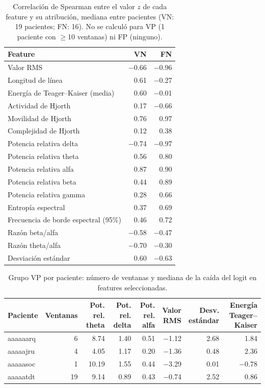 \begin{table}[htbp]
\centering
\small
\caption{Correlación de Spearman entre el valor $z$ de cada feature y su atribución, mediana entre pacientes (VN: 19 pacientes; FN: 16). No se calculó para VP (1 paciente con $\geq$10 ventanas) ni FP (ninguno).}
\label{tab:direccion}
\begin{tabular}{lrr}
\toprule
Feature & VN & FN \\
\midrule
Valor RMS & $-$0.66 & $-$0.96 \\
Longitud de línea & 0.61 & $-$0.27 \\
Energía de Teager--Kaiser (media) & 0.60 & $-$0.01 \\
Actividad de Hjorth & 0.17 & $-$0.66 \\
Movilidad de Hjorth & 0.76 & 0.97 \\
Complejidad de Hjorth & 0.12 & 0.38 \\
Potencia relativa delta & $-$0.74 & $-$0.97 \\
Potencia relativa theta & 0.56 & 0.80 \\
Potencia relativa alfa & 0.87 & 0.90 \\
Potencia relativa beta & 0.44 & 0.89 \\
Potencia relativa gamma & 0.28 & 0.66 \\
Entropía espectral & 0.37 & 0.69 \\
Frecuencia de borde espectral (95\%) & 0.46 & 0.72 \\
Razón beta/alfa & $-$0.58 & $-$0.47 \\
Razón theta/alfa & $-$0.70 & $-$0.30 \\
Desviación estándar & 0.60 & $-$0.63 \\
\bottomrule
\end{tabular}
\end{table}

\begin{table}[htbp]
\centering
\small
\caption{Grupo VP por paciente: número de ventanas y mediana de la caída del logit en features seleccionadas.}
\label{tab:vp_pac}
\begin{tabular}{lrrrrrrr}
\toprule
Paciente & Ventanas & \shortstack{Pot. rel.\\theta} & \shortstack{Pot. rel.\\delta} & \shortstack{Pot. rel.\\alfa} & \shortstack{Valor\\RMS} & \shortstack{Desv.\\estándar} & \shortstack{Energía\\Teager--Kaiser} \\
\midrule
aaaaaarq & 6 & 8.74 & 1.40 & 0.51 & $-$1.12 & 2.68 & 1.84 \\
aaaaajru & 4 & 4.05 & 1.17 & 0.20 & $-$1.36 & 0.48 & 2.36 \\
aaaaasoc & 1 & 10.19 & 1.55 & 0.44 & $-$3.29 & 0.01 & $-$0.78 \\
aaaaatdt & 19 & 9.14 & 0.89 & 0.43 & $-$0.74 & 2.52 & 0.86 \\
\bottomrule
\end{tabular}
\end{table}


